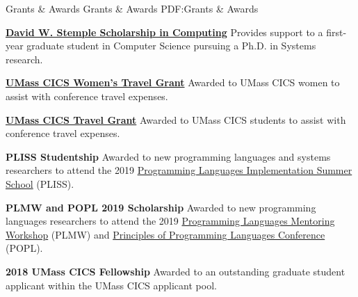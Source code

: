\Section
{Grants \& Awards}
{Grants \& Awards}
{PDF:Grants \& Awards}

\Entry
\href{https://umass.academicworks.com/opportunities/3470}{\textbf{David W. Stemple Scholarship in Computing}}
\dotfill
\textbf{}
\SubEntry
\Gap
Provides support to a first-year graduate student in Computer Science pursuing a Ph.D. in Systems research. 

\Entry
\href{http://cswomenumass.github.io//travelgrant.html}{\textbf{UMass CICS Women's Travel Grant}}
\dotfill
\textbf{}
\SubEntry
\Gap
Awarded to UMass CICS women to assist with conference travel expenses.

\Entry
\href{https://www.cics.umass.edu/grads/student-forms}{\textbf{UMass CICS Travel Grant}}
\dotfill
\textbf{}
\SubEntry
\Gap
Awarded to UMass CICS students to assist with conference travel expenses.

\Entry
\textbf{PLISS Studentship}
\dotfill
\textbf{}
\SubEntry
\Gap
Awarded to new programming languages and systems researchers to attend the 2019 \href{https://pliss2019.github.io/}{Programming Languages Implementation Summer School} (PLISS).

\Entry
\textbf{PLMW and POPL 2019 Scholarship}
\dotfill
\textbf{}
\SubEntry
\Gap
Awarded to new programming languages researchers to attend the 2019 \href{https://popl19.sigplan.org/track/PLMW-2019-papers}{Programming Languages Mentoring Workshop} (PLMW)
and \href{https://popl19.sigplan.org/}{Principles of Programming Languages Conference} (POPL).

\BigGap
\Entry
\textbf{2018 UMass CICS Fellowship}
\dotfill
\textbf{}
\SubEntry
\Gap
Awarded to an outstanding graduate student applicant within the UMass CICS applicant pool.
